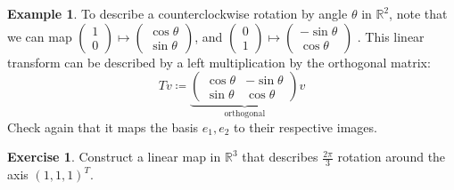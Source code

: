 \documentclass[12pt, a4paper]{article}
\newcommand{\R}{\mathbb{R}}
\theoremstyle{remark}
\theoremstyle{definition}
\newtheorem{example}{Example}
\newtheorem{exercise}{Exercise}
\numberwithin{equation}{section}
\numberwithin{definition}{section}
\numberwithin{example}{section}
\numberwithin{exercise}{section}
\numberwithin{remark}{section}
\numberwithin{figure}{section}
\begin{document}
\begin{example}
    To describe a counterclockwise rotation by angle $\theta$ in $\R^2$,
    note that we can map 
    $
    \begin{pmatrix}
        1 \\ 0
    \end{pmatrix}
    \mapsto
    \begin{pmatrix}
        \cos \theta \\ \sin\theta
    \end{pmatrix}
    $,
    and
    $
    \begin{pmatrix}
        0 \\ 1
    \end{pmatrix}
    \mapsto
    \begin{pmatrix}
        -\sin\theta \\ \cos\theta
    \end{pmatrix}
    $
    .
    This linear transform can be described by a left multiplication by the orthogonal matrix:
    \begin{equation*}
        Tv \coloneqq
        \underbrace{
        \begin{pmatrix}
            \cos \theta & -\sin \theta \\
            \sin \theta & \cos \theta
        \end{pmatrix}
    }_{\text{orthogonal}}
        v
    \end{equation*}
    Check again that it maps the basis $e_1, e_2$ to their respective images.
\end{example}
\begin{exercise}
    Construct a linear map in $\R^3$ that describes $\frac{2\pi}{3}$ rotation around the axis $\left( 1,1,1 \right)^T$.
\end{exercise}
\end{document}
